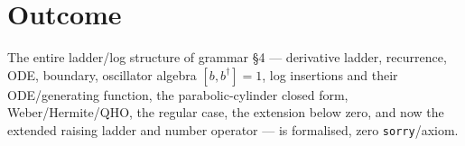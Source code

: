 \documentclass[11pt]{article}
\begin{document}
\section{Outcome}
The entire ladder/log structure of grammar \S4 --- derivative ladder, recurrence, ODE, boundary,
oscillator algebra $[b,b^\dagger]=1$, log insertions and their ODE/generating function, the
parabolic-cylinder closed form, Weber/Hermite/QHO, the regular case, the extension below zero, and
now the extended raising ladder and number operator --- is formalised, zero \texttt{sorry}/axiom.
\end{document}
